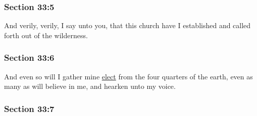 
	\subsubsection{Section 33:5} %
		\label{DC33-5}

		And verily, verily, I say unto you, that this church have I established and called forth out of the wilderness.


	\subsubsection{Section 33:6} %
		\label{DC33-6}

		And even so will I gather mine \hyperref[ELECTION]{elect} from the four quarters of the earth, even as many as will believe in me, and hearken unto my voice.


	\subsubsection{Section 33:7} %
		\label{DC33-7}

